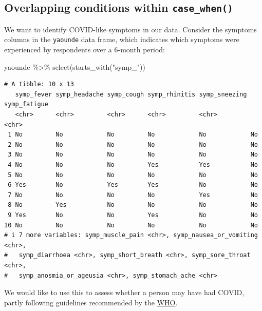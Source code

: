 \documentclass[
  letterpaper,
  DIV=11,
  numbers=noendperiod]{scrreprt}
\newenvironment{Shaded}{\begin{snugshade}}{\end{snugshade}}
\newcommand{\FunctionTok}[1]{\textcolor[rgb]{0.28,0.35,0.67}{#1}}
\newcommand{\NormalTok}[1]{\textcolor[rgb]{0.00,0.23,0.31}{#1}}
\newcommand{\SpecialCharTok}[1]{\textcolor[rgb]{0.37,0.37,0.37}{#1}}
\newcommand{\StringTok}[1]{\textcolor[rgb]{0.13,0.47,0.30}{#1}}
\begin{document}
\hypertarget{overlapping-conditions-within-case_when}{%
\subsection{\texorpdfstring{Overlapping conditions within
\texttt{case\_when()}}{Overlapping conditions within case\_when()}}\label{overlapping-conditions-within-case_when}}

We want to identify COVID-like symptoms in our data. Consider the
symptoms columns in the \texttt{yaounde} data frame, which indicates
which symptoms were experienced by respondents over a 6-month period:

\begin{Shaded}
\begin{Highlighting}[]
\NormalTok{yaounde }\SpecialCharTok{\%\textgreater{}\%} 
  \FunctionTok{select}\NormalTok{(}\FunctionTok{starts\_with}\NormalTok{(}\StringTok{"symp\_"}\NormalTok{))}
\end{Highlighting}
\end{Shaded}

\begin{verbatim}
# A tibble: 10 x 13
   symp_fever symp_headache symp_cough symp_rhinitis symp_sneezing symp_fatigue
   <chr>      <chr>         <chr>      <chr>         <chr>         <chr>       
 1 No         No            No         No            No            No          
 2 No         No            No         No            No            No          
 3 No         No            No         No            No            No          
 4 No         No            No         Yes           Yes           No          
 5 No         No            No         No            No            No          
 6 Yes        No            Yes        Yes           No            No          
 7 No         No            No         No            Yes           No          
 8 No         Yes           No         No            No            No          
 9 Yes        No            No         Yes           No            No          
10 No         No            No         No            No            No          
# i 7 more variables: symp_muscle_pain <chr>, symp_nausea_or_vomiting <chr>,
#   symp_diarrhoea <chr>, symp_short_breath <chr>, symp_sore_throat <chr>,
#   symp_anosmia_or_ageusia <chr>, symp_stomach_ache <chr>
\end{verbatim}

We would like to use this to assess whether a person may have had COVID,
partly following guidelines recommended by the
\href{https://apps.who.int/iris/handle/10665/333752}{WHO}.
\end{document}
